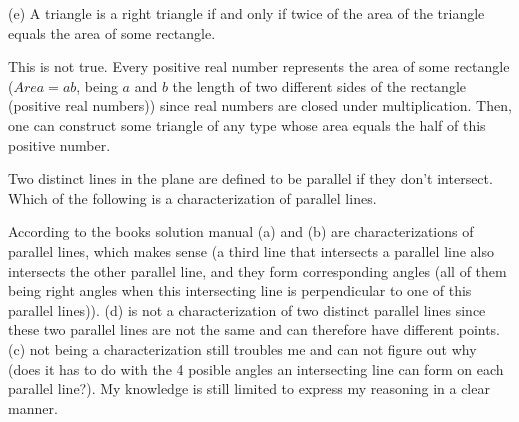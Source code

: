 \documentclass[12pt]{article}
\newenvironment{problem}[2][Problem]{\begin{trivlist}
		\item[\hskip \labelsep {\bfseries #1}\hskip \labelsep {\bfseries #2.}]}{\end{trivlist}}
\newenvironment{solution}[2][Solution]{\begin{trivlist}
		\item[\hskip \labelsep {\bfseries #1}\hskip \labelsep {\bfseries #2.}]}{\end{trivlist}}
\begin{document}
\begin{problem}{83}
		(e) A triangle is a right triangle if and only if twice of the area of the triangle equals the area of some rectangle.
		\begin{solution}{e}
			This is not true. Every positive real number represents the area of some rectangle ($Area = ab$, being $a$ and $b$ the length of two different sides of the rectangle (positive real numbers)) since real numbers are closed under multiplication. Then, one can construct some triangle of any type whose area equals the half of this positive number. 
		\end{solution}
	\end{problem}

	\begin{problem}{84}
		Two distinct lines in the plane are defined to be parallel if they don't intersect. Which of the following is a characterization of parallel lines.
		
		\begin{solution}{}
			According to the books solution manual (a) and (b) are characterizations of parallel lines, which makes sense (a third line that intersects a parallel line also intersects the other parallel line, and they form corresponding angles (all of them being right angles when this intersecting line is perpendicular to one of this parallel lines)). (d) is not a characterization of two distinct parallel lines since these two parallel lines are not the same and can therefore have different points. (c) not being a characterization still troubles me and can not figure out why (does it has to do with the 4 posible angles an intersecting line can form on each parallel line?). My knowledge is still limited to express my reasoning in a clear manner.
		\end{solution}
	\end{problem} 
	
\end{document}
